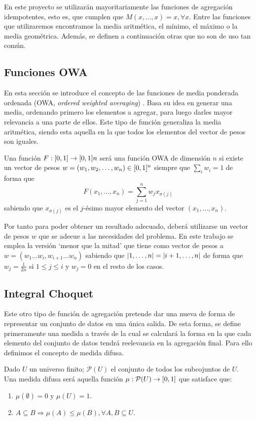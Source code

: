En este proyecto se utilizarán mayoritariamente las funciones de agregación idempotentes, esto es, que cumplen que $M(x,\dots ,x)=x, \forall x$. Entre las funciones que utilizaremos encontramos la media aritmética, el mínimo, el máximo o la media geométrica. Además, se definen a continuación otras que no son de uso tan común.
\subsection{Funciones OWA}
En esta sección se introduce el concepto de las funciones de media ponderada ordenada (OWA, {\em  ordered weighted averaging}) \cite{art:yagerowa, art:paternain, art:bustinceowa}. Basa su idea en generar una media, ordenando primero los elementos a agregar, para luego darles mayor relevancia a una parte de ellos. Este tipo de función generaliza la media aritmética, siendo esta aquella en la que todos los elementos del vector de pesos son iguales.

\begin{definition}\label{def:owa}
Una  función $F:\unitspace{n}$ será una función OWA de dimensión $n$ si existe un vector de pesos $w=(w_{1},w_{2},\dots,w_{n})\in [0,1]^{n}$ siempre que $\sum_{i}w_{i}=1$ de forma que
$$F(x_{1},\dots,x_{n})=\sum^{n}_{j=1}w_{j}x_{\sigma(j)}$$
sabiendo que $x_{\sigma(j)}$ es el $j$-ésimo mayor elemento del vector $(x_{1},\dots,x_{n})$.
\end{definition}

Por tanto para poder obtener un resultado adecuado, deberá utilizarse un vector de pesos $w$ que se adecue a las necesidades del problema. En este trabajo se emplea la versión `menor que la mitad' que tiene como vector de pesos a $w=(w_{1}\dots w_{i}, w_{i+1}\dots w_{n})$ sabiendo que $\left\vert1, \dots, n\right\vert=\left\vert i+1,\dots,n\right\vert$ de forma que $w_{j}=\frac{1}{2n}$ si $1\leq j\leq i$ y $w_{j}=0$ en el resto de los casos.

\subsection{Integral Choquet}
Este otro tipo de función \cite{art:choquet, art:sugenochoquet} de agregación pretende dar una nueva de forma de representar un conjunto de datos en una única salida. De esta forma, se define primeramente una medida a través de la cual se calculará la forma en la que cada elemento del conjunto de datos tendrá reelevancia en la agregación final. Para ello definimos el concepto de medida difusa.
\begin{definition}\label{def:medidadifusa}
Dado $U$ un universo finito; $\mathcal{P}(U)$ el conjunto de todos los subcojuntos de $U$. Una medida difusa será aquella función $\mu:\mathcal{P}(U)\rightarrow[0,1]$ que satisface que:
\begin{enumerate}
	\item $\mu(\emptyset)=0$ y $\mu(U)=1$.
	\item $A\subseteq B \Rightarrow \mu(A)\leq\mu (B), \forall A, B \subseteq U$.
\end{enumerate}
\end{definition}

